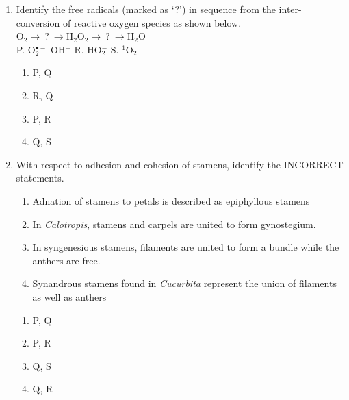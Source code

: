 \documentclass[journal,12pt,onecolumn]{IEEEtran}
\begin{document}
\begin{enumerate}[label=\arabic*.]
\item Identify the free radicals (marked as ‘?’) in sequence from the inter-conversion of reactive oxygen species as shown below.\\[1em]
$\mathrm{O}_2 \rightarrow~?~\rightarrow \mathrm{H}_2\mathrm{O}_2 \rightarrow~?~\rightarrow \mathrm{H}_2\mathrm{O}$\\[1em]
P. O$_2^{\bullet-}$ \quad  OH$^-$ \quad R. HO$_2^-$ \quad S. $^1$O$_2$
\begin{multicols}{4}
\begin{enumerate}[label=(\Alph*)]
\item P, Q
\item R, Q
\item P, R
\item Q, S
\end{enumerate}
\end{multicols}

\item With respect to adhesion and cohesion of stamens, identify the INCORRECT statements.
\begin{enumerate}[label=\Alph*. ,start=16]
\item Adnation of stamens to petals is described as epiphyllous stamens
\item In \textit{Calotropis}, stamens and carpels are united to form gynostegium.
\item In syngenesious stamens, filaments are united to form a bundle while the anthers are free.
\item Synandrous stamens found in \textit{Cucurbita} represent the union of filaments as well as anthers
\end{enumerate}
\begin{multicols}{4}
\begin{enumerate}[label=(\Alph*)]
\item P, Q
\item P, R
\item Q, S
\item Q, R
\end{enumerate}
\end{multicols}


\end{enumerate}
\end{document}
